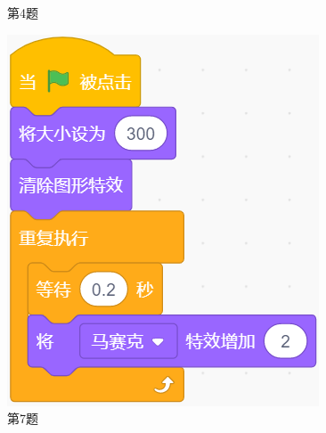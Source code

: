 \documentclass[10pt, a4paper]{article}
\begin{document}
\begin{enumerate}
\begin{figure}[htbp]
\begin{minipage}[t]{.2\textwidth}
                \caption*{第4题}
            \end{minipage}
            \begin{minipage}[t]{.2\textwidth}
                \centering
                \includegraphics[width=\textwidth]{7.png}
                \caption*{第7题}
            \end{minipage}
            \begin{minipage}[t]{.2\textwidth}
                \centering

\end{minipage}
\end{figure}
\end{enumerate}
\end{document}
